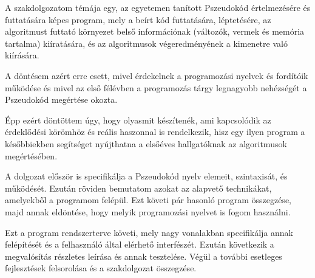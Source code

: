 A szakdolgozatom témája egy, az egyetemen tanított Pszeudokód értelmezésére és futtatására képes program, mely a beírt kód futtatására, léptetésére, az algoritmust futtató környezet belső információnak (változók, vermek és memória tartalma) kiíratására, és az algoritmusok végeredményének a kimenetre való kiírására.

A döntésem azért erre esett, mivel érdekelnek a programozási nyelvek és fordítóik működése és mivel az első félévben a programozás tárgy legnagyobb nehézségét a Pszeudokód megértése okozta.

Épp ezért döntöttem úgy, hogy olyasmit készítenék, ami kapcsolódik az érdeklődési körömhöz és reális haszonnal is rendelkezik, hisz egy ilyen program a későbbiekben segítséget nyújthatna a elsőéves hallgatóknak az algoritmusok megértésében.

A dolgozat először is specifikálja a Pszeudokód nyelv elemeit, szintaxisát, és működését. Ezután röviden bemutatom azokat az alapvető technikákat, amelyekből a programom felépül. Ezt követi pár hasonló program összegzése, majd annak eldöntése, hogy melyik programozási nyelvet is fogom használni.

Ezt a program rendszerterve követi, mely nagy vonalakban specifikálja annak felépítését és a felhasználó által elérhető interfészét. Ezután következik a megvalósítás részletes leírása és annak tesztelése. Végül a további esetleges fejlesztések felsorolása és a szakdolgozat összegzése.